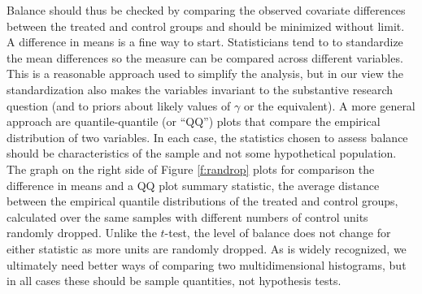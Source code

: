 \documentclass[11pt,titlepage]{article}
\begin{document}
Balance should thus be checked by comparing the observed covariate
differences between the treated and control groups and should be
minimized without limit.  A difference in means is a fine way to
start.  Statisticians tend to to standardize the mean differences so
the measure can be compared across different variables.  This is a
reasonable approach used to simplify the analysis, but in our view the
standardization also makes the variables invariant to the substantive
research question (and to priors about likely values of $\gamma$ or
the equivalent).  A more general approach are quantile-quantile (or
``QQ'') plots that compare the empirical distribution of two
variables.  In each case, the statistics chosen to assess balance
should be characteristics of the sample and not some hypothetical
population.  The graph on the right side of Figure \ref{f:randrop}
plots for comparison the difference in means and a QQ plot summary
statistic, the average distance between the empirical quantile
distributions of the treated and control groups, calculated over the
same samples with different numbers of control units randomly dropped.
Unlike the $t$-test, the level of balance does not change for either
statistic as more units are randomly dropped.  As is widely
recognized, we ultimately need better ways of comparing two
multidimensional histograms, but in all cases these should be sample
quantities, not hypothesis tests.




\end{document}
